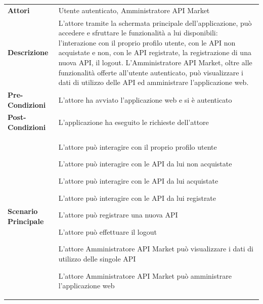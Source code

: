 \begin{longtable}{ l | p{11cm}}
	\hline
	\rowcolor{Gray}
	 \multicolumn{2}{c}{UC2 - Main post-autenticazione} \\
	 \hline
	\textbf{Attori} & Utente autenticato, Amministratore API Market \\
	\textbf{Descrizione} & L'attore tramite la schermata principale
	dell'applicazione, può accedere e sfruttare le funzionalità a lui disponibili: l'interazione
	con il proprio profilo utente, con le API non acquistate e non, con le API registrate, la
	registrazione di una nuova API, il logout. 
	L'Amministratore API Market, oltre alle funzionalità offerte all'utente autenticato, può
	visualizzare i dati di utilizzo delle API ed amministrare l'applicazione web.  \\
	\textbf{Pre-Condizioni} & L'attore ha avviato l'applicazione web e si è autenticato \\
	\textbf{Post-Condizioni} & L'applicazione ha eseguito le richieste dell'attore \\
	\textbf{Scenario Principale} & 
	\begin{enumerate*}[label=(\arabic*.),itemjoin={\newline}]
		\item L'attore può interagire con il proprio profilo utente
		\item L'attore può interagire con le API da lui non acquistate
		\item L'attore può interagire con le API da lui acquistate
		\item L'attore può interagire con le API da lui registrate
		\item L'attore può registrare una nuova API
		\item L'attore può effettuare il logout
		\item L'attore Amministratore API Market può visualizzare i dati di utilizzo delle singole API 
		\item L'attore Amministratore API Market può amministrare l'applicazione web
	\end{enumerate*}\\
\end{longtable}